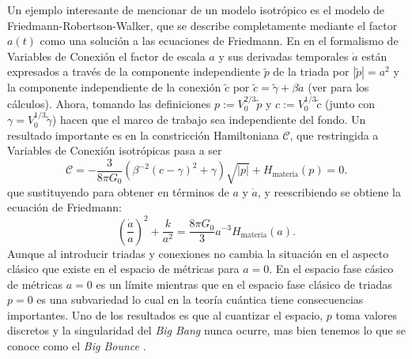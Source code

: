 Un ejemplo interesante de mencionar de un modelo isotr\'{o}pico es el modelo de Friedmann-Robertson-Walker, que se describe completamente mediante el factor $a(t)$ como una soluci\'{o}n a las ecuaciones de Friedmann. En en el formalismo de Variables de Conexi\'{o}n el factor de escala $a$ y sus derivadas temporales $\dot{a}$ est\'{a}n expresados a trav\'{e}s de la componente independiente $\tilde{p}$ de la triada por $|\tilde{p}| = a^{2}$ y la componente independiente de la conexi\'{o}n $\tilde{c}$ por $\tilde{c} = \tilde{\gamma} + \beta \dot{a}$ (ver \cite{Bojowald2000} para los c\'{a}lculos). Ahora, tomando las definiciones $p := V_{0}^{2/3} \tilde{p}$ y $c := V_{0}^{1/3} \tilde{c}$ (junto con $\gamma = V^{1/3}_{0} \tilde{\gamma}$) hacen que el marco de trabajo sea independiente del fondo. Un resultado importante es en la constricci\'{o}n Hamiltoniana $\mathcal{C}$, que restringida a Variables de Conexi\'{o}n isotr\'{o}picas pasa a ser \cite{Bojowald2002, Bojowald2005}
%
\begin{equation}
\mathcal{C} = -\frac{3}{8 \pi G_{0}} \left( \beta^{-2} (c - \gamma)^{2} + \gamma \right) \sqrt{|p|} + H_{\mathrm{materia}} (p) = 0.
\end{equation}
%
que sustituyendo para obtener en t\'{e}rminos de $a$ y $\dot{a}$, y reescribiendo se obtiene la ecuaci\'{o}n de Friedmann:
%
\begin{equation}
\left( \frac{\dot{a}}{a} \right)^{2} + \frac{k}{a^{2}} = \frac{8 \pi G_{0}}{3} a^{-3} H_{\mathrm{materia}}(a).
\end{equation}
%
Aunque al introducir triadas y conexiones no cambia la situaci\'{o}n en el aspecto cl\'{a}sico que existe en el espacio de m\'{e}tricas para $a = 0$. En el espacio fase c\'{a}sico de m\'{e}tricas $a = 0$ es un l\'{i}mite mientras que en el espacio fase cl\'{asico} de triadas $p = 0$ es una subvariedad lo cual en la teor\'{i}a cu\'{a}ntica tiene consecuencias importantes. {\color{red} Uno de los resultados es que al cuantizar el espacio, $p$ toma valores discretos y la singularidad del \emph{Big Bang} nunca ocurre, mas bien tenemos lo que se conoce como el \emph{Big Bounce} \cite{BB}.}